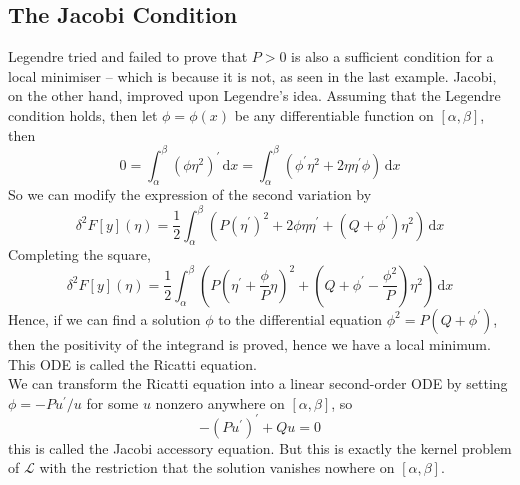 \subsection{The Jacobi Condition}
Legendre tried and failed to prove that $P>0$ is also a sufficient condition for a local minimiser -- which is because it is not, as seen in the last example.
Jacobi, on the other hand, improved upon Legendre's idea.
Assuming that the Legendre condition holds, then let $\phi=\phi(x)$ be any differentiable function on $[\alpha,\beta]$, then
$$0=\int_\alpha^\beta (\phi\eta^2)^\prime\,\mathrm dx=\int_\alpha^\beta(\phi^\prime\eta^2+2\eta\eta^\prime\phi)\,\mathrm dx$$
So we can modify the expression of the second variation by
$$\delta^2F[y](\eta)=\frac{1}{2}\int_\alpha^\beta(P(\eta^\prime)^2+2\phi\eta\eta^\prime+(Q+\phi^\prime)\eta^2)\,\mathrm dx$$
Completing the square,
$$\delta^2F[y](\eta)=\frac{1}{2}\int_\alpha^\beta \left( P\left( \eta^\prime+\frac{\phi}{P}\eta \right)^2 +\left( Q+\phi^\prime-\frac{\phi^2}{P} \right)\eta^2\right)\,\mathrm dx$$
Hence, if we can find a solution $\phi$ to the differential equation $\phi^2=P(Q+\phi^\prime)$, then the positivity of the integrand is proved, hence we have a local minimum.
This ODE is called the Ricatti equation.\\
We can transform the Ricatti equation into a linear second-order ODE by setting $\phi=-Pu^\prime/u$ for some $u$ nonzero anywhere on $[\alpha,\beta]$, so
$$-(Pu^\prime)^\prime+Qu=0$$
this is called the Jacobi accessory equation.
But this is exactly the kernel problem of $\mathcal L$ with the restriction that the solution vanishes nowhere on $[\alpha,\beta]$.